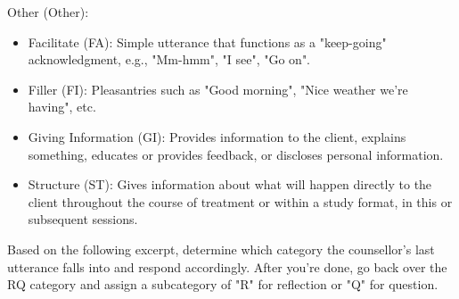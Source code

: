 \begin{tcolorbox}
	Other (Other):
	\begin{itemize}[itemsep=0pt, parsep=0pt]
		\item Facilitate (FA): Simple utterance that functions as a "keep-going" acknowledgment, e.g., "Mm-hmm", "I see", "Go on".
		\item Filler (FI): Pleasantries such as "Good morning", "Nice weather we're having", etc.
		\item Giving Information (GI): Provides information to the client, explains something, educates or provides feedback, or discloses personal information.
		\item Structure (ST): Gives information about what will happen directly to the client throughout the course of treatment or within a study format, in this or subsequent sessions.
	\end{itemize}

	Based on the following excerpt, determine which category the counsellor's last utterance falls into and respond accordingly. After you're done, go back over the RQ category and assign a subcategory of "R" for reflection or "Q" for question.
\end{tcolorbox}




